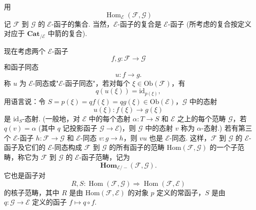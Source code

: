 用
\[
\operatorname{Hom}_{\mathcal{E}}(\mathcal{F}, \mathcal{G})
\]
记 $\mathcal{F}$ 到 $\mathcal{G}$ 的 $\mathcal{E}$-函子的集合. 当然，$\mathcal{E}$-函子的复合是 $\mathcal{E}$-函子 (所考虑的复合按定义对应于 $\mathbf{Cat}_{/\mathcal{E}}$ 中箭的复合).

现在考虑两个 $\mathcal{E}$-函子
\[
f, g \colon \mathcal{F} \longrightarrow \mathcal{G}
\]
和函子同态
\[
u \colon f \longrightarrow g.
\]
称 $u$ 为 $\mathcal{E}$-同态或"$\mathcal{E}$-函子同态"，若对每个 $\xi \in \mathrm{Ob}(\mathcal{F})$，有
\[
q(u(\xi)) = \mathrm{id}_{p(\xi)},
\]
用语言说：令 $S = p(\xi) = qf(\xi) = qg(\xi) \in \mathrm{Ob}(\mathcal{E})$，$\mathcal{G}$ 中的态射
\[
u(\xi) \colon f(\xi) \longrightarrow g(\xi)
\]
是 $\mathrm{id}_S$-态射. (一般地，对 $\mathcal{E}$ 中的每个态射 $\alpha \colon T \to S$ 和 $\mathcal{E}$ 之上的每个范畴 $\mathcal{G}$，若 $q(v) = \alpha$ (其中 $q$ 记投影函子 $\mathcal{G} \to \mathcal{E}$)，则 $\mathcal{G}$ 中的态射 $v$ 称为 $\alpha$-态射.) 若有第三个 $\mathcal{E}$-函子 $h \colon \mathcal{F} \to \mathcal{G}$ 和 $\mathcal{E}$-同态 $v \colon g \to h$，则 $vu$ 也是 $\mathcal{E}$-同态. 这样，$\mathcal{F}$ 到 $\mathcal{G}$ 的 $\mathcal{E}$-函子及它们的 $\mathcal{E}$-同态构成 $\mathcal{F}$ 到 $\mathcal{G}$ 的所有函子的范畴 Hom$(\mathcal{F}, \mathcal{G})$ 的一个子范畴，称它为 $\mathcal{F}$ 到 $\mathcal{G}$ 的 $\mathcal{E}$-函子范畴，记为
\[
\mathbf{Hom}_{\mathcal{E}/-}(\mathcal{F}, \mathcal{G}).
\]
它也是函子对
\[
R, S \colon \operatorname{Hom}(\mathcal{F}, \mathcal{G}) \Longrightarrow \operatorname{Hom}(\mathcal{F}, \mathcal{E})
\]
的核子范畴，其中 $R$ 是由 Hom$(\mathcal{F}, \mathcal{E})$ 的对象 $p$ 定义的常函子，$S$ 是由 $q \colon \mathcal{G} \to \mathcal{E}$ 定义的函子 $f \mapsto q \circ f$.

